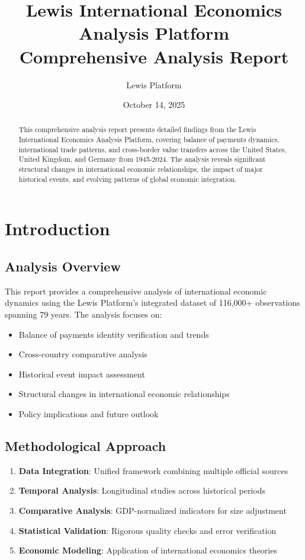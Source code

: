 \documentclass[11pt,a4paper]{article}
\title{\textbf{Lewis International Economics Analysis Platform} \\
\large Comprehensive Analysis Report}
\author{Lewis Platform}
\date{October 14, 2025}
\begin{document}
\maketitle

\begin{abstract}
This comprehensive analysis report presents detailed findings from the Lewis International Economics Analysis Platform, covering balance of payments dynamics, international trade patterns, and cross-border value transfers across the United States, United Kingdom, and Germany from 1945-2024. The analysis reveals significant structural changes in international economic relationships, the impact of major historical events, and evolving patterns of global economic integration.
\end{abstract}

\tableofcontents
\newpage

\section{Introduction}

\subsection{Analysis Overview}
This report provides a comprehensive analysis of international economic dynamics using the Lewis Platform's integrated dataset of 116,000+ observations spanning 79 years. The analysis focuses on:

\begin{itemize}
    \item Balance of payments identity verification and trends
    \item Cross-country comparative analysis
    \item Historical event impact assessment
    \item Structural changes in international economic relationships
    \item Policy implications and future outlook
\end{itemize}

\subsection{Methodological Approach}
\begin{enumerate}
    \item \textbf{Data Integration}: Unified framework combining multiple official sources
    \item \textbf{Temporal Analysis}: Longitudinal studies across historical periods
    \item \textbf{Comparative Analysis}: GDP-normalized indicators for size adjustment
    \item \textbf{Statistical Validation}: Rigorous quality checks and error verification
    \item \textbf{Economic Modeling}: Application of international economics theories
\end{enumerate}
\end{document}
